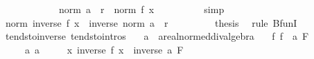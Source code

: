 \begin{isabellebody}
\ {}\ \isacommand{{\isachardot}{\kern0pt}}\isamarkupfalse%
\isanewline
\ \ \ \ \ \ \isamarkupfalse%
\ \isamarkupfalse%
\ {\isachardoublequoteopen}norm\ a\ {\isacharminus}{\kern0pt}\ r\ {\isasymle}\ norm\ {\isacharparenleft}{\kern0pt}f\ x{\isacharparenright}{\kern0pt}{\isachardoublequoteclose}\isanewline
\ \ \ \ \ \ \ \ \isamarkupfalse%
\ simp\isanewline
\ \ \ \ \isamarkupfalse%
\isanewline
\ \ \ \ \isamarkupfalse%
\ \isamarkupfalse%
\ {\isachardoublequoteopen}norm\ {\isacharparenleft}{\kern0pt}inverse\ {\isacharparenleft}{\kern0pt}f\ x{\isacharparenright}{\kern0pt}{\isacharparenright}{\kern0pt}\ {\isasymle}\ inverse\ {\isacharparenleft}{\kern0pt}norm\ a\ {\isacharminus}{\kern0pt}\ r{\isacharparenright}{\kern0pt}{\isachardoublequoteclose}\ \isacommand{{\isachardot}{\kern0pt}}\isamarkupfalse%
\isanewline
\ \ \isamarkupfalse%
\isanewline
\ \ \isamarkupfalse%
\ \isamarkupfalse%
\ {\isacharquery}{\kern0pt}thesis\ \isamarkupfalse%
\ {\isacharparenleft}{\kern0pt}rule\ BfunI{\isacharparenright}{\kern0pt}\isanewline
{}\isamarkupfalse%
%
\endisatagproof
{\isafoldproof}%
%
\isadelimproof
\isanewline
%
\endisadelimproof
\isanewline
{}\isamarkupfalse%
\ tendsto{\isacharunderscore}{\kern0pt}inverse\ {\isacharbrackleft}{\kern0pt}tendsto{\isacharunderscore}{\kern0pt}intros{\isacharbrackright}{\kern0pt}{\isacharcolon}{\kern0pt}\isanewline
\ \ \ a\ {\isacharcolon}{\kern0pt}{\isacharcolon}{\kern0pt}\ {\isachardoublequoteopen}{\isacharprime}{\kern0pt}a{\isacharcolon}{\kern0pt}{\isacharcolon}{\kern0pt}real{\isacharunderscore}{\kern0pt}normed{\isacharunderscore}{\kern0pt}div{\isacharunderscore}{\kern0pt}algebra{\isachardoublequoteclose}\isanewline
\ \ \ f{\isacharcolon}{\kern0pt}\ {\isachardoublequoteopen}{\isacharparenleft}{\kern0pt}f\ {\isasymlonglongrightarrow}\ a{\isacharparenright}{\kern0pt}\ F{\isachardoublequoteclose}\isanewline
\ \ \ \ \ a{\isacharcolon}{\kern0pt}\ {\isachardoublequoteopen}a\ {\isasymnoteq}\ {}{\isachardoublequoteclose}\isanewline
\ \ \ {\isachardoublequoteopen}{\isacharparenleft}{\kern0pt}{\isacharparenleft}{\kern0pt}{\isasymlambda}x{\isachardot}{\kern0pt}\ inverse\ {\isacharparenleft}{\kern0pt}f\ x{\isacharparenright}{\kern0pt}{\isacharparenright}{\kern0pt}\ {\isasymlonglongrightarrow}\ inverse\ a{\isacharparenright}{\kern0pt}\ F{\isachardoublequoteclose}\isanewline

\end{isabellebody}
